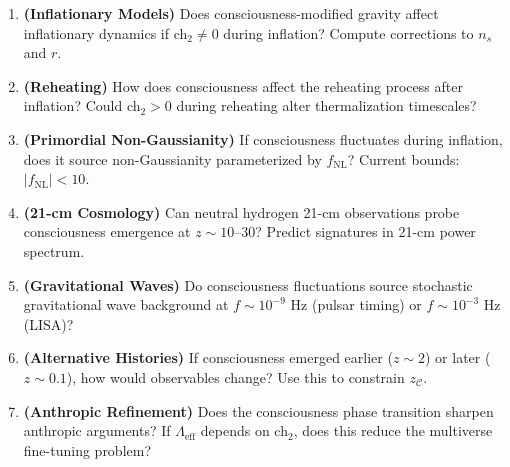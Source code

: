\begin{enumerate}
\item \textbf{(Inflationary Models)} Does consciousness-modified gravity affect inflationary dynamics if ch$_2 \neq 0$ during inflation? Compute corrections to $n_s$ and $r$.

\item \textbf{(Reheating)} How does consciousness affect the reheating process after inflation? Could ch$_2 > 0$ during reheating alter thermalization timescales?

\item \textbf{(Primordial Non-Gaussianity)} If consciousness fluctuates during inflation, does it source non-Gaussianity parameterized by $f_{\text{NL}}$? Current bounds: $|f_{\text{NL}}| < 10$.

\item \textbf{(21-cm Cosmology)} Can neutral hydrogen 21-cm observations probe consciousness emergence at $z \sim 10\text{--}30$? Predict signatures in 21-cm power spectrum.

\item \textbf{(Gravitational Waves)} Do consciousness fluctuations source stochastic gravitational wave background at $f \sim 10^{-9}$ Hz (pulsar timing) or $f \sim 10^{-3}$ Hz (LISA)?

\item \textbf{(Alternative Histories)} If consciousness emerged earlier ($z \sim 2$) or later ($z \sim 0.1$), how would observables change? Use this to constrain $z_{\mathcal{C}}$.

\item \textbf{(Anthropic Refinement)} Does the consciousness phase transition sharpen anthropic arguments? If $\Lambda_{\text{eff}}$ depends on ch$_2$, does this reduce the multiverse fine-tuning problem?
\end{enumerate}
